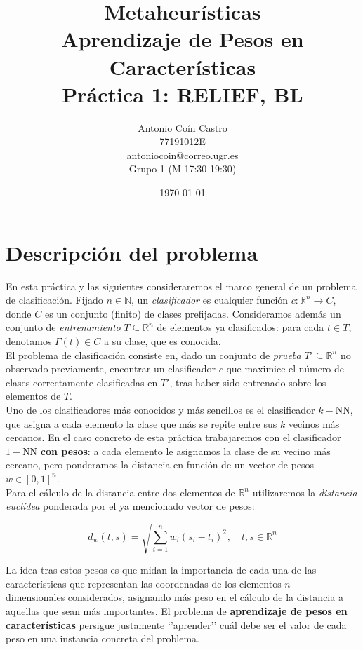 \documentclass[12pt]{article}
\title{Metaheurísticas\\ \Large Aprendizaje de Pesos en Características \\ \large Práctica 1: RELIEF, BL}
\author{Antonio Coín Castro \\ 77191012E \\ antoniocoin@correo.ugr.es \\ Grupo 1 (M 17:30-19:30)}
\date{\today}
\begin{document}
\maketitle

\newpage
\section{Descripción del problema}

En esta práctica y las siguientes consideraremos el marco general de un problema de clasificación. Fijado $n \in \mathbb{N}$, un \textit{clasificador} es cualquier función $c: \mathbb{R}^n \to C$, donde $C$ es un conjunto (finito) de clases prefijadas. Consideramos además un conjunto de \textit{entrenamiento} $T \subseteq \mathbb{R}^n$ de elementos ya clasificados: para cada $t \in T$, denotamos $\Gamma(t) \in C$ a su clase, que es conocida.\\

El problema de clasificación consiste en, dado un conjunto de \textit{prueba} $T'\subseteq \mathbb{R}^n$ no observado previamente, encontrar un clasificador $c$ que maximice el número de clases correctamente clasificadas en $T'$, tras haber sido entrenado sobre los elementos de $T$.\\

Uno de los clasificadores más conocidos y más sencillos es el clasificador $k-$NN, que asigna a cada elemento la clase que más se repite entre sus $k$ vecinos más cercanos. En el caso concreto de esta práctica trabajaremos con el clasificador $1-$NN \textbf{con pesos}: a cada elemento le asignamos la clase de su vecino más cercano, pero ponderamos la distancia en función de un vector de pesos $w \in [0,1]^n$.\\

Para el cálculo de la distancia entre dos elementos de $\mathbb{R}^n$ utilizaremos la \textit{distancia euclídea} ponderada por el ya mencionado vector de pesos:

\[
    d_w(t, s) = \sqrt{\sum_{i=1}^n w_i (s_i - t_i)^2}, \quad t, s \in \mathbb{R}^n
\]
\vspace{.5em}

La idea tras estos pesos es que midan la importancia de cada una de las características que representan las coordenadas de los elementos $n-$dimensionales considerados, asignando más peso en el cálculo de la distancia a aquellas que sean más importantes. El problema de \textbf{aprendizaje de pesos en características} persigue justamente `'aprender'' cuál debe ser el valor de cada peso en una instancia concreta del problema.\\
\end{document}
